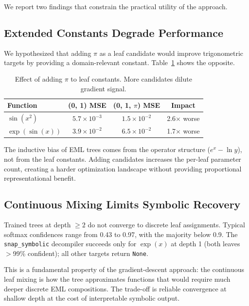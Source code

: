 \documentclass[11pt,a4paper]{article}
\begin{document}
We report two findings that constrain the practical utility of the approach.

\subsection{Extended Constants Degrade Performance}

We hypothesized that adding $\pi$ as a leaf candidate would improve trigonometric targets by providing a domain-relevant constant.
Table~\ref{tab:constants} shows the opposite.

\begin{table}[ht]
\centering
\caption{Effect of adding $\pi$ to leaf constants. More candidates dilute gradient signal.}
\label{tab:constants}
\begin{tabular}{lccc}
\toprule
Function & (0, 1) MSE & (0, 1, $\pi$) MSE & Impact \\
\midrule
$\sin(x^2)$ & $5.7 \times 10^{-3}$ & $1.5 \times 10^{-2}$ & 2.6$\times$ worse \\
$\exp(\sin(x))$ & $3.9 \times 10^{-2}$ & $6.5 \times 10^{-2}$ & 1.7$\times$ worse \\
\bottomrule
\end{tabular}
\end{table}

The inductive bias of EML trees comes from the operator structure ($e^x - \ln y$), not from the leaf constants.
Adding candidates increases the per-leaf parameter count, creating a harder optimization landscape without providing proportional representational benefit.

\subsection{Continuous Mixing Limits Symbolic Recovery}

Trained trees at depth $\geq 2$ do not converge to discrete leaf assignments.
Typical softmax confidences range from 0.43 to 0.97, with the majority below 0.9.
The \texttt{snap\_symbolic} decompiler succeeds only for $\exp(x)$ at depth 1 (both leaves $>$99\% confident); all other targets return \texttt{None}.

This is a fundamental property of the gradient-descent approach: the continuous leaf mixing is how the tree approximates functions that would require much deeper discrete EML compositions.
The trade-off is reliable convergence at shallow depth at the cost of interpretable symbolic output.
\end{document}

